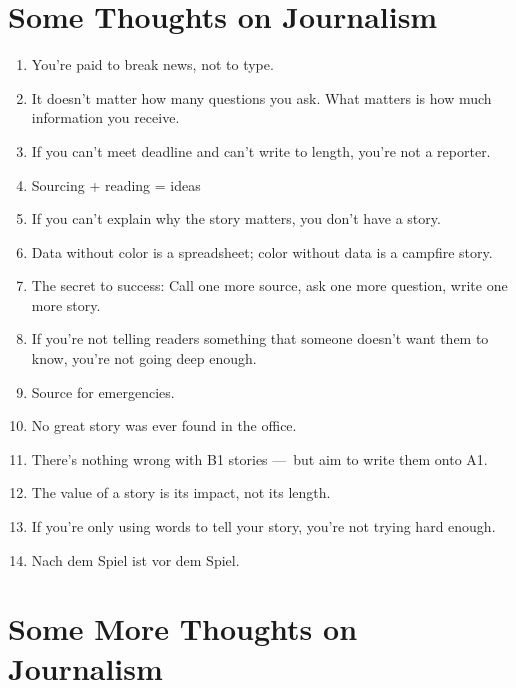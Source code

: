 \documentclass[
  11pt,
  american,
  letterpaperpaper,
  extrafontsizes,onecolumn,openright
  ]{memoir}
\providecommand{\tightlist}{%
  \setlength{\itemsep}{0pt}\setlength{\parskip}{0pt}}
\begin{document}
\mainmatter

\hypertarget{some-thoughts-on-journalism}{%
\chapter*{Some Thoughts on Journalism}\label{some-thoughts-on-journalism}}

\begin{enumerate}
\def\labelenumi{\arabic{enumi}.}
\tightlist
\item
  You're paid to break news, not to type.~
\item
  It doesn't matter how many questions you ask. What matters is how much information you receive.
\item
  If you can't meet deadline and can't write to length, you're not a reporter.~
\item
  Sourcing + reading = ideas
\item
  If you can't explain why the story matters, you don't have a story.~
\item
  Data without color is a spreadsheet; color without data is a campfire story.~
\item
  The secret to success: Call one more source, ask one more question, write one more story.~
\item
  If you're not telling readers something that someone doesn't want them to know, you're not going deep enough.
\item
  Source for emergencies.~
\item
  No great story was ever found in the office.~
\item
  There's nothing wrong with B1 stories ---~but aim to write them onto A1.~
\item
  The value of a story is its impact, not its length.~
\item
  If you're only using words to tell your story, you're not trying hard enough.~
\item
  Nach dem Spiel ist vor dem Spiel.
\end{enumerate}

\hypertarget{some-more-thoughts-on-journalism}{%
\chapter*{Some More Thoughts on Journalism}\label{some-more-thoughts-on-journalism}}
\end{document}

